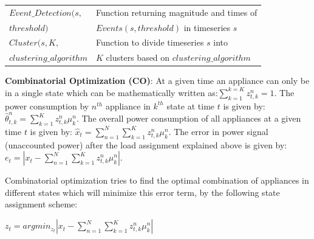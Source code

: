 \documentclass[conference]{IEEEtran}
\begin{document}
\begin{table}[ht!]
\begin{tabular}{|l|l|}
\hline
$Event\_Detection(s,$ & Function returning magnitude and times of \\[0.1cm]
$threshold)$                  &$Events(s,threshold)$ in timeseries $s$\\[0.1cm]
\hline
$Cluster(s,K,$& Function to divide timeseries $s$ into\\[0.1cm]
$clustering\_algorithm$&$K$ clusters based on $clustering\_algorithm$ \\
\hline

                             
                                                                               

\hline
%
\end{tabular}
\end{table}

\noindent \textbf{Combinatorial Optimization (CO)}: At a given time an appliance can only be in a single state which can be mathematically written as:$\sum\limits_{k=1}^{k=K} z_{t,k}^n=1$. The power consumption by $n^{th}$ appliance in $k^{th}$ state at time $t$ is given by: $\hat{\theta}^n_{t,k}=\sum\limits_{k=1}^{K} z_{t,k}^n \mu_k^n$. The overall power consumption of all appliances at a given time $t$ is given by: $\hat{x}_{t}=\sum\limits_{n=1}^{N}\sum\limits_{k=1}^{K} z_{t,k}^n \mu_k^n$. The error in power signal (unaccounted power) after the load assignment explained above is given by: $e_t=|x_t-\sum\limits_{n=1}^{N}\sum\limits_{k=1}^{K}z_{t,k}^n\mu_k^n|$.

\noindent Combinatorial optimization tries to find the optimal combination of appliances in different states which will minimize this error term, by the following state assignment scheme:

$z_t=arg min_{z_t}|x_t-\sum\limits_{n=1}^{N}\sum\limits_{k=1}^{K}z_{t,k}^n\mu_k^n|$
\end{document}
